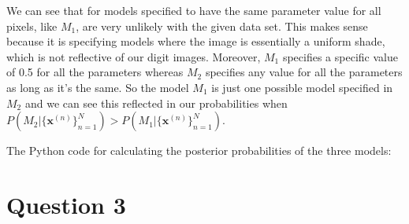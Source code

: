 \documentclass[12pt]{article}
\begin{document}
We can see that for models specified to have the same parameter value for all pixels, like $M_1$, are very unlikely with the given data set. This makes sense because it is specifying models where the image is essentially a uniform shade, which is not reflective of our digit images. Moreover, $M_1$ specifies a specific value of 0.5 for all the parameters whereas $M_2$ specifies any value for all the parameters as long as it's the same. So the model $M_1$ is just one possible model specified in $M_2$ and we can see this reflected in our probabilities when $P(M_2|\{\textbf{x}^{(n)}\}_{n=1}^{N}) > P(M_1|\{\textbf{x}^{(n)}\}_{n=1}^{N})$.

\newpage
The Python code for calculating the posterior probabilities of the three models:

\newpage
\section*{Question 3}
\end{document}
